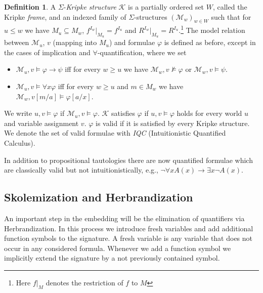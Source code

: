 \documentclass{easychair}
\theoremstyle{definition}
\theoremstyle{definition}
\theoremstyle{definition}
\theoremstyle{definition}
\theoremstyle{definition}
\newtheorem{definition}[theorem]{Definition}
\theoremstyle{definition}
\theoremstyle{definition}
\begin{document}
\begin{definition}
	A $\Sigma$-\emph{Kripke structure} $\mathcal{K}$ is a partially ordered set $W$, called the Kripke \emph{frame}, and an indexed family of $\Sigma$-structures $(\mathcal{M}_w)_{w\in W}$ such that for $u\leq w$ we have $M_u\subseteq M_w$, $f^{I_w}|_{M_u} = f^{I_u}$ and $R^{I_w}|_{M_u} = R^{I_u}$.\footnote{Here $f|_M$ denotes the restriction of $f$ to $M$}
	The model relation between $\mathcal M_u$, $v$ (mapping into $M_u$) and formulae $\varphi$ is defined as before, except in the cases of implication and $\forall$-quantification, where we set
	\begin{itemize}
		\item $\mathcal M_u, v\models \varphi\to\psi$ iff for every $w\geq u$ we have $\mathcal M_w, v\not\models\varphi$ or $\mathcal M_w, v\models\psi$.
		\item $\mathcal M_u, v\models\forall x\varphi$ iff for every $w\geq u$ and $m\in M_w$ we have $\mathcal M_w, v[m/a]\models\varphi[a/x]$.
	\end{itemize}
	We write $u, v\models\varphi$ if $\mathcal M_u, v\models \varphi$. $\mathcal{K}$ satisfies $\varphi$ if $u, v\models\varphi$ holds for every world $u$ and variable assignment $v$. $\varphi$ is valid if it is satisfied by every Kripke structure.
	We denote the set of valid formulae with \emph{IQC} (Intuitionistic Quantified Calculus).
\end{definition}
In addition to propositional tautologies there are now quantified formulae which are classically valid but not intuitionistically, e.g., $\neg\forall x A(x)\to \exists x \neg A(x)$.

\subsection{Skolemization and Herbrandization}\label{section:herbrandiaztion}

An important step in the embedding will be the elimination of quantifiers via Herbrandization.
In this process we introduce fresh variables and add additional function symbols to the signature.
A fresh variable is any variable that does not occur in any considered formula.
Whenever we add a function symbol we implicitly extend the signature by a not previously contained symbol.
\end{document}
